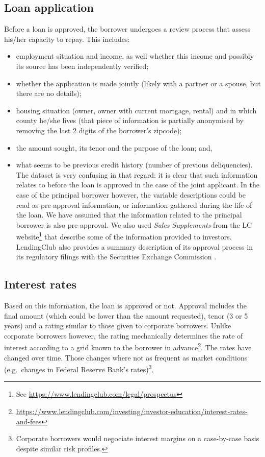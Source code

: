 \documentclass[11pt,]{report}
\let\rmarkdownfootnote\footnote%
\def\footnote{\protect\rmarkdownfootnote}
\begin{document}
\hypertarget{loan-application}{%
\subsection{Loan application}\label{loan-application}}

Before a loan is approved, the borrower undergoes a review process that assess his/her capacity to repay. This includes:

\begin{itemize}
\item
  employment situation and income, as well whether this income and possibly its source has been independently verified;
\item
  whether the application is made jointly (likely with a partner or a spouse, but there are no details);
\item
  housing situation (owner, owner with current mortgage, rental) and in which county he/she lives (that piece of information is partially anonymised by removing the last 2 digits of the borrower's zipcode);
\item
  the amount sought, its tenor and the purpose of the loan; and,
\item
  what seems to be previous credit history (number of previous deliquencies). The dataset is very confusing in that regard: it is clear that such information relates to before the loan is approved in the case of the joint applicant. In the case of the principal borrower however, the variable descriptions could be read as pre-approval information, or information gathered during the life of the loan. We have assumed that the information related to the principal borrower is also pre-approval. We also used \emph{Sales Supplements} from the LC website\footnote{See \url{https://www.lendingclub.com/legal/prospectus}} that describe some of the information provided to investors. LendingClub also provides a summary description of its approval process in its regulatory filings with the Securities Exchange Commission \citep{LC201908S3}.
\end{itemize}

\hypertarget{interest-rates}{%
\subsection{Interest rates}\label{interest-rates}}

Based on this information, the loan is approved or not. Approval includes the final amount (which could be lower than the amount requested), tenor (3 or 5 years) and a rating similar to those given to corporate borrowers. Unlike corporate borrowers however, the rating mechanically determines the rate of interest according to a grid known to the borrower in advance\footnote{\url{https://www.lendingclub.com/investing/investor-education/interest-rates-and-fees}}. The rates have changed over time. Those changes where not as frequent as market conditions (e.g.~changes in Federal Reserve Bank's rates)\footnote{Corporate borrowers would negociate interest margins on a case-by-case basis despite similar risk profiles.}.
\end{document}
